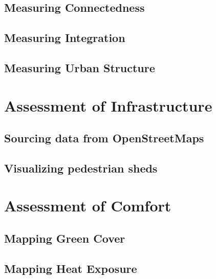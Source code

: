 \documentclass[
]{latex/krantz}
\begin{document}
\hypertarget{measuring-connectedness}{%
\subsection{Measuring Connectedness}\label{measuring-connectedness}}

\hypertarget{measuring-integration}{%
\subsection{Measuring Integration}\label{measuring-integration}}

\hypertarget{measuring-urban-structure}{%
\subsection{Measuring Urban Structure}\label{measuring-urban-structure}}

\hypertarget{assessment-of-infrastructure}{%
\section{Assessment of Infrastructure}\label{assessment-of-infrastructure}}

\hypertarget{sourcing-data-from-openstreetmaps}{%
\subsection{Sourcing data from OpenStreetMaps}\label{sourcing-data-from-openstreetmaps}}

\hypertarget{visualizing-pedestrian-sheds}{%
\subsection{Visualizing pedestrian sheds}\label{visualizing-pedestrian-sheds}}

\hypertarget{assessment-of-comfort}{%
\section{Assessment of Comfort}\label{assessment-of-comfort}}

\hypertarget{mapping-green-cover}{%
\subsection{Mapping Green Cover}\label{mapping-green-cover}}

\hypertarget{mapping-heat-exposure}{%
\subsection{Mapping Heat Exposure}\label{mapping-heat-exposure}}
\end{document}
